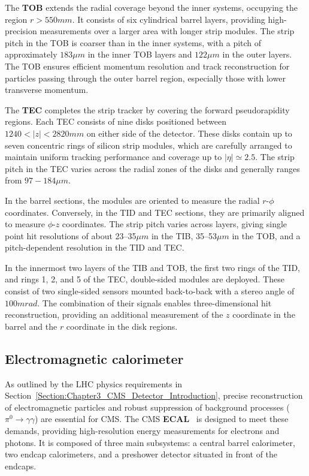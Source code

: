 The \textbf{\ac{TOB}} extends the radial coverage beyond the inner systems, occupying the region $r > 550\unit{mm}$. It consists of six cylindrical barrel layers, providing high-precision measurements over a larger area with longer strip modules. The strip pitch in the \ac{TOB} is coarser than in the inner systems, with a pitch of approximately $183\unit{\mu m}$ in the inner \ac{TOB} layers and $122\unit{\mu m}$ in the outer layers. The \ac{TOB} ensures efficient momentum resolution and track reconstruction for particles passing through the outer barrel region, especially those with lower transverse momentum.

The \textbf{\ac{TEC}} completes the strip tracker by covering the forward pseudorapidity regions. Each \ac{TEC} consists of nine disks positioned between $1240 < |z| < 2820\unit{mm}$ on either side of the detector. These disks contain up to seven concentric rings of silicon strip modules, which are carefully arranged to maintain uniform tracking performance and coverage up to $|\eta| \simeq 2.5$. The strip pitch in the \ac{TEC} varies across the radial zones of the disks and generally ranges from $97-184\unit{\mu m}$.

In the barrel sections, the modules are oriented to measure the radial $r\text{-}\phi$ coordinates. Conversely, in the \ac{TID} and \ac{TEC} sections, they are primarily aligned to measure $\phi\text{-}z$ coordinates. The strip pitch varies across layers, giving single point hit resolutions of about 23–35$\unit{\mu m}$ in the TIB, 35–53$\unit{\mu m}$ in the TOB, and a pitch-dependent resolution in the TID and TEC.

In the innermost two layers of the \ac{TIB} and \ac{TOB}, the first two rings of the \ac{TID}, and rings 1, 2, and 5 of the \ac{TEC}, double-sided modules are deployed. These consist of two single-sided sensors mounted back-to-back with a stereo angle of $100\unit{mrad}$. The combination of their signals enables three-dimensional hit reconstruction, providing an additional measurement of the $z$ coordinate in the barrel and the $r$ coordinate in the disk regions.

\subsection{Electromagnetic calorimeter}

As outlined by the \ac{LHC} physics requirements in Section~\ref{Section:Chapter3_CMS_Detector_Introduction}, precise reconstruction of electromagnetic particles and robust suppression of background processes ($\pi^0 \to \gamma \gamma$) are essential for \ac{CMS}. The \ac{CMS} \textbf{\ac{ECAL}}~\cite{LHC_CMS,CMS_Detector_Run3,CMS_ECAL_Performance_Run2} is designed to meet these demands, providing high-resolution energy measurements for electrons and photons. It is composed of three main subsystems: a central barrel calorimeter, two endcap calorimeters, and a preshower detector situated in front of the endcaps.

